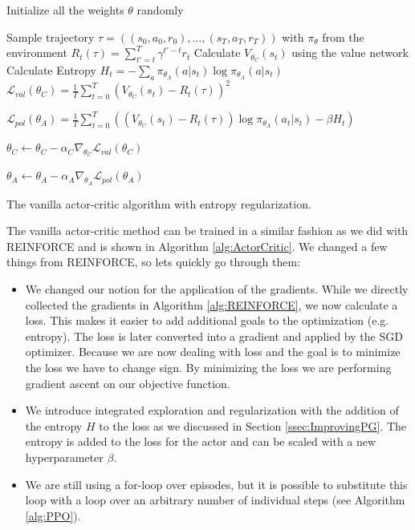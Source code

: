 \begin{algorithm}[ht]
  Initialize all the weights $\theta$ randomly \;
    {
   Sample trajectory $\tau = ((s_0, a_0, r_0), \dots, (s_T, a_T, r_T))$ with $\pi_\theta$ from the environment \;
      {
      $R_t(\tau) = \sum^T_{t'=t} \gamma^{t'-t}r_t$ \;
      Calculate $V_{\theta_C}(s_t)$ using the value network \;
      Calculate Entropy $H_t = - \sum_a \pi_{\theta_A}(a|s_t) \log \pi_{\theta_A}(a|s_t)$
    }
    $\mathcal{L}_{val}(\theta_C) = \frac{1}{T} \sum^T_{t=0}(V_{\theta_C}(s_t) - R_t(\tau))^2$ 

    $\mathcal{L}_{pol}(\theta_A) = \frac{1}{T} \sum^T_{t=0}\left(\left(V_{\theta_C}(s_t)-R_t(\tau)\right) \log \pi_{\theta_A}(a_t|s_t) - \beta H_t\right)$ 

    $\theta_C \leftarrow \theta_C - \alpha_C \nabla_{\theta_C} \mathcal{L}_{val}(\theta_C)$ 
  
    $\theta_A \leftarrow \theta_A - \alpha_A \nabla_{\theta_A} \mathcal{L}_{pol}(\theta_A)$ 

  }

  \caption[The Vanilla Actor-Critic Algorithm]{The vanilla actor-critic algorithm with entropy regularization.}\label{alg:ActorCritic}
 \end{algorithm}

The vanilla actor-critic method can be trained in a similar fashion as we did with REINFORCE and is shown in Algorithm \ref{alg:ActorCritic}. We changed a few things from REINFORCE, so lets quickly go through them:
\begin{itemize}
  \item We changed our notion for the application of the gradients. While we directly collected the gradients in Algorithm \ref{alg:REINFORCE}, we now calculate a loss. This makes it easier to add additional goals to the optimization (e.g. entropy). The loss is later converted into a gradient and applied by the SGD optimizer. Because we are now dealing with loss and the goal is to minimize the loss we have to change sign. By minimizing the loss we are performing gradient ascent on our objective function.
  \item We introduce integrated exploration and regularization with the addition of the entropy $H$ to the loss as we discussed in Section \ref{ssec:ImprovingPG}. The entropy is added to the loss for the actor and can be scaled with a new hyperparameter $\beta$.
  \item We are still using a for-loop over episodes, but it is possible to substitute this loop with a loop over an arbitrary number of individual steps (see Algorithm \ref{alg:PPO}).   
\end{itemize}

